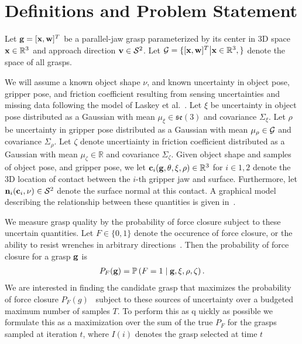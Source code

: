 \section{Definitions and Problem Statement}

Let $\mathbf{g} = [\mathbf{x}, \mathbf{w}]^T$ be a parallel-jaw grasp parameterized by its center in 3D space $\mathbf{x} \in \mathbb{R}^3$ and approach direction $\mathbf{v} \in \mathcal{S}^2$.
Let $\mathcal{G} = \{ [\mathbf{x}, \mathbf{w}]^T \big| \mathbf{x} \in \mathbb{R}^3,  \}$ denote the space of all grasps.

We will assume a known object shape $\nu$, and known uncertainty in object pose, gripper pose, and friction coefficient resulting from sensing uncertainties and missing data following the model of Laskey et al.~\cite{laskey2015bandits}. 
Let $\xi$ be uncertainty in object pose distributed as a Gaussian with mean $\mu_{\xi} \in \mathfrak{se}(3)$ and covariance $\Sigma_{\xi}$.
Let $\rho$ be uncertainty in gripper pose distributed as a Gaussian with mean $\mu_{\rho} \in \mathcal{G}$ and covariance $\Sigma_{\rho}$.
Let $\zeta$ denote uncertiainty in friction coefficient distributed as a Gaussian with mean $\mu_{\zeta} \in \mathbb{R}$ and covariance $\Sigma_{\zeta}$.
Given object shape and samples of object pose, and gripper pose, we let $\mathbf{c}_i(\mathbf{g}, \theta, \xi, \rho) \in \mathbb{R}^3$ for $i \in {1, 2}$ denote the 3D location of contact between the $i$-th gripper jaw and surface.
Furthermore, let $\mathbf{n}_i(\mathbf{c}_i, \nu) \in \mathcal{S}^2$ denote the surface normal at this contact.
A graphical model describing the relationship between these quantities is given in~.

We measure grasp quality by the probability of force closure subject to these uncertain quantities.
Let $F \in \{0, 1\}$ denote the occurence of force closure, or the ability to resist wrenches in arbitrary directions~\cite{ferrari1992}.
Then the probability of force closure for a grasp $\mathbf{g}$ is
\begin{align*}
	P_F(\mathbf{g}) = \mathbb{P}\left(F = 1 \mid \mathbf{g}, \xi, \rho, \zeta \right).
\end{align*}
\noindent We are interested in finding the candidate grasp that maximizes the probability of force closure $P_F(g)$~\cite{kim2012physically, laskey2015bandits, mahler2015gp, weisz2012pose} subject to these sources of uncertainty over a budgeted maximum number of samples $T$.
To perform this as q	uickly as possible we formulate this as a maximization over the sum of the true $P_F$ for the grasps sampled at iteration $t$, where $I(i)$ denotes the grasp selected at time $t$

